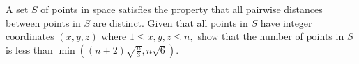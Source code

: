 A set $ S$ of points in space satisfies the property that all pairwise distances between points in $ S$ are distinct. Given that all points in $ S$ have integer coordinates $ (x,y,z)$ where $ 1 \leq x,y, z \leq n,$ show that the number of points in $ S$ is less than $ \min \left((n + 2)\sqrt {\frac {n}{3}}, n \sqrt {6}\right).$